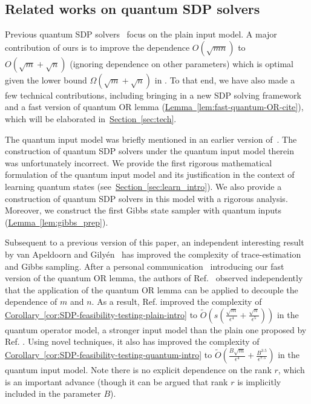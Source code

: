 \documentclass[a4paper,UKenglish,cleveref, autoref]{lipics-v2019}
\theoremstyle{remark}
\numberwithin{equation}{section}
\numberwithin{oracle}{section}
\numberwithin{remark}{section}
\newcommand{\cor}[1]{\hyperref[cor:#1]{Corollary~\ref*{cor:#1}}}
\newcommand{\lem}[1]{\hyperref[lem:#1]{Lemma~\ref*{lem:#1}}}
\renewcommand{\sec}[1]{\hyperref[sec:#1]{Section~\ref*{sec:#1}}}
\begin{document}
\subsection{Related works on quantum SDP solvers}
Previous quantum SDP solvers~\cite{brandao2016quantum, vanApeldoorn2017quantum} focus on the plain input model. A major contribution of ours is to improve the dependence $O(\sqrt{mn})$ to $O(\sqrt{m} +\sqrt{n})$ (ignoring dependence on other parameters) which is optimal given the lower bound $\Omega(\sqrt{m}+\sqrt{n})$ in \cite{brandao2016quantum}. To that end, we have also made a few technical contributions, including bringing in a new SDP solving framework and a fast version of quantum OR lemma (\lem{fast-quantum-OR-cite}), which will be elaborated in~\sec{tech}.

The quantum input model was briefly mentioned in an earlier version of~\cite{brandao2016quantum}. The construction of quantum SDP solvers under the quantum input model therein was unfortunately incorrect. We provide the first rigorous mathematical formulation of the quantum input model and its justification in the context of learning quantum states (see~\sec{learn_intro}). We also provide a construction of quantum SDP solvers in this model with a rigorous analysis.  Moreover, we construct the first Gibbs state sampler with quantum inputs (\lem{gibbs_prep}).

Subsequent to a previous version of this paper, an independent interesting result by van Apeldoorn and Gily{\'e}n~\cite{vAG18} has improved the complexity of trace-estimation and Gibbs sampling. After a personal communication~\cite{dewolf2017personal} introducing our fast version of the quantum OR lemma, the authors of Ref.~\cite{vAG18} observed independently that the application of the quantum OR lemma \cite{harrow2017sequential} can be applied to decouple the dependence of $m$ and $n$. As a result, Ref. \cite{vAG18} improved the complexity of \cor{SDP-feasibility-testing-plain-intro} to $\tilde{O}(s(\frac{\sqrt{m}}{\epsilon^{4}}+\frac{\sqrt{n}}{\epsilon^{5}}))$ in the quantum operator model, a stronger input model than the plain one proposed by Ref. \cite{vAG18}. Using novel techniques, it also has improved the complexity of \cor{SDP-feasibility-testing-quantum-intro} to $\tilde{O}(\frac{B\sqrt{m}}{\epsilon^{4}}+\frac{B^{3.5}}{\epsilon^{7.5}})$ in the quantum input model. Note there is no explicit dependence on the rank $r$, which is an important advance (though it can be argued that rank $r$ is implicitly included in the parameter $B$).
\end{document}
